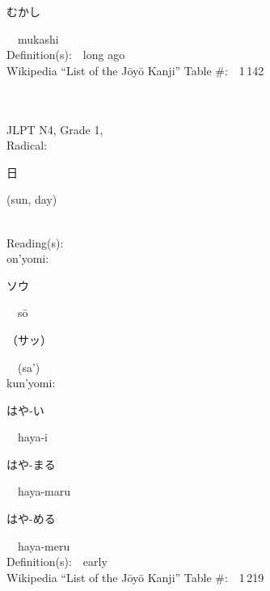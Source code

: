 \begin{multicols}{2}
{\hspace*{2em}}{\begin{CJK}{UTF8}{min} むかし \end{CJK}}\ \ mukashi\ \ \\
Definition(s):\ \ long ago \\
Wikipedia ``List of the J\=oy\=o Kanji'' Table \#:\ \ 1\,142 \\
\ \ \\
{\fontsize{34pt}{40pt}  }\ \ \\  %
{JLPT N4, Grade 1, \\Radical:\ \ {\begin{CJK}{UTF8}{min} 日 \end{CJK}} (sun, day) } \\
Reading(s):\ \ \\
{\hspace*{1em}}on'yomi:\ \ \\
{\hspace*{2em}}{\begin{CJK}{UTF8}{min} ソウ \end{CJK}}\ \ s\=o\ \ \\
{\hspace*{2em}}{\begin{CJK}{UTF8}{min} （サッ） \end{CJK}}\ \ (sa')\ \ \\
{\hspace*{1em}}kun'yomi:\ \ \\
{\hspace*{2em}}{\begin{CJK}{UTF8}{min} はや-い \end{CJK}}\ \ haya-i\ \ \\
{\hspace*{2em}}{\begin{CJK}{UTF8}{min} はや-まる \end{CJK}}\ \ haya-maru\ \ \\
{\hspace*{2em}}{\begin{CJK}{UTF8}{min} はや-める \end{CJK}}\ \ haya-meru\ \ \\
Definition(s):\ \ early \\
Wikipedia ``List of the J\=oy\=o Kanji'' Table \#:\ \ 1\,219 \\
\ \ \\

\end{multicols}

